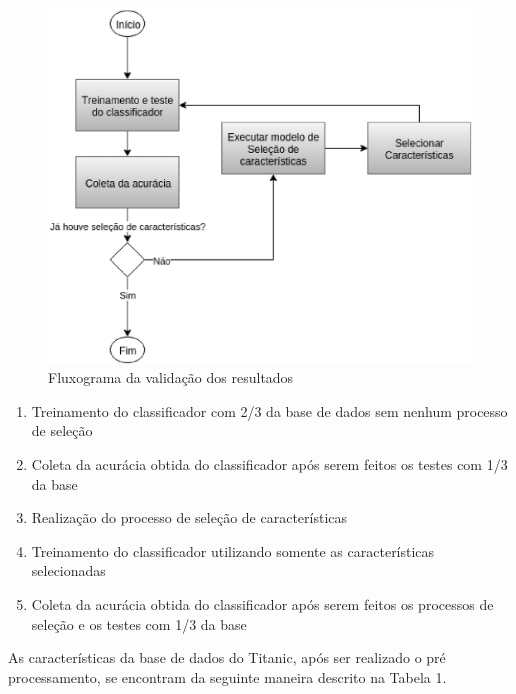 \begin{figure}[H]
	\centering
	\label{fig10}
		\includegraphics[keepaspectratio=true,scale=0.6]{figuras/fig10.eps}
	\caption{Fluxograma da validação dos resultados}
\end{figure}

\begin{enumerate}
	\item{Treinamento do classificador com 2/3 da base de dados sem nenhum processo de seleção}
	\item{Coleta da acurácia obtida do classificador após serem feitos os testes com 1/3 da base}
	\item{Realização do processo de seleção de características} 
	\item{Treinamento do classificador utilizando somente as características selecionadas}
	\item{Coleta da acurácia obtida do classificador após serem feitos os processos de seleção e os testes com 1/3 da base}
\end{enumerate}


As características da base de dados do Titanic, após ser realizado o pré processamento, se encontram da seguinte maneira descrito na Tabela 1.

